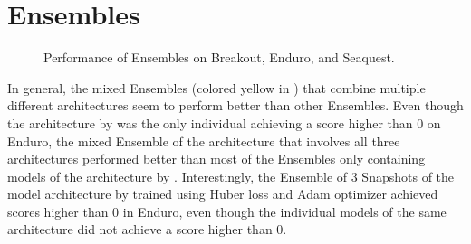 \section{Ensembles}
\begin{figure}[ht!]
    \centering


    \caption{Performance of Ensembles on Breakout, Enduro, and Seaquest.}
    \label{fig:res:ensembles_only}
\end{figure}

In general, the mixed Ensembles (colored yellow in ) that combine multiple different architectures seem to perform better than other Ensembles. Even though the architecture by \textcite{mnih_playing_2013} was the only individual achieving a score higher than 0 on Enduro, the mixed Ensemble of the architecture that involves all three architectures performed better than most of the Ensembles only containing models of the architecture by \textcite{mnih_playing_2013}. Interestingly, the Ensemble of 3 Snapshots of the model architecture by \textcite{mnih_human-level_2015} trained using Huber loss and Adam optimizer achieved scores higher than 0 in Enduro, even though the individual models of the same architecture did not achieve a score higher than 0.

